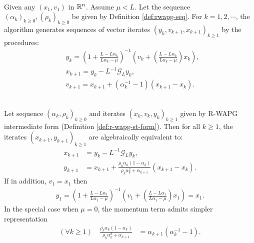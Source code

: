 \documentclass[12pt]{article}
\begin{document}
    \begin{definition}\label{def:r-wapg-st-form} \; \\
        Given any $(x_1, v_1)$ in $\mathbb R^n$. 
        Assume $\mu < L$.
        Let the sequence $(\alpha_k)_{k \ge 0}, (\rho_k)_{k\ge 0}$ be given by Definition \ref{def:rwapg-seq}. 
        For $k = 1, 2, \cdots $, the algorithm generates sequences of vector iterates $(y_k, v_{k + 1}, x_{k + 1})_{k \ge 1}$ by the procedures: 
        \begin{align*}
            & y_k = 
            \left(
                1 + \frac{L - L\alpha_k}{L\alpha_k - \mu}
            \right)^{-1}
            \left(
                v_k + 
                \left(\frac{L - L\alpha_k}{L\alpha_k - \mu} \right) x_k
            \right), 
            \\
            & x_{k + 1} = 
            y_k - L^{-1} \mathcal G_L y_k, 
            \\
            & v_{k + 1} = 
            x_{k + 1} + (\alpha_k^{-1} -1)(x_{k + 1} - x_k). 
        \end{align*}
    \end{definition}
    
    \begin{proposition}\label{prop:r-wapg-momentum-repr}
        \;\\
        Let sequence $(\alpha_k, \rho_k)_{k \ge 0}$ and iterates $(x_k, v_k, y_k)_{k\ge 1}$ given by R-WAPG intermediate form (Definition \ref{def:r-wapg-st-form}). 
        Then for all $k \ge 1$, the iterates $(x_{k + 1}, y_{k + 1})_{k \ge 1}$ are algebraically equivalent to: 
        \begin{align*}
            x_{k + 1} &= y_k - L^{-1}\mathcal G_Ly_k, 
            \\
            y_{k + 1} &= 
            x_{k + 1} + 
            \frac{\rho_k\alpha_k(1 - \alpha_k)}
            {\rho_k\alpha_k^2 + \alpha_{k + 1}}(x_{k + 1} - x_k). 
        \end{align*}
        If in addition, $v_1 = x_1$ then 
        \begin{align*}
            y_1 = \left(
                1 + \frac{L - L \alpha_1}{L\alpha_1 - \mu}
            \right)^{-1}\left(
                v_1 + \left(
                    \frac{L - L \alpha_1}{L \alpha_1 - \mu}
                \right)x_1
            \right) = x_1. 
        \end{align*}
        In the special case when $\mu = 0$, the momentum term admits simpler representation 
        \begin{align*}
            (\forall k \ge 1) \quad 
            \frac{\rho_k\alpha_k(1 - \alpha_k)}{\rho_k\alpha_k^2 + \alpha_{k + 1}}
            & = \alpha_{k + 1}(\alpha_k^{-1} - 1). 
        \end{align*}
    \end{proposition}
\end{document}
